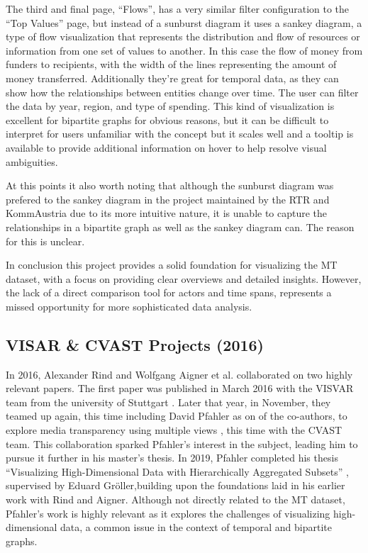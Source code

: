 \documentclass{vgtc}
\begin{document}
The third and final page, ``Flows'', has a very similar filter configuration to the ``Top Values'' page, but instead of a sunburst diagram it uses a sankey diagram, a type of flow visualization that represents the distribution and flow of resources or information from one set of values to another. In this case the flow of money from funders to recipients, with the width of the lines representing the amount of money transferred. Additionally they're great for temporal data, as they can show how the relationships between entities change over time. The user can filter the data by year, region, and type of spending. This kind of visualization is excellent for bipartite graphs for obvious reasons, but it can be difficult to interpret for users unfamiliar with the concept \textendash{} but it scales well and a tooltip is available to provide additional information on hover to help resolve visual ambiguities.

At this points it also worth noting that although the sunburst diagram was prefered to the sankey diagram in the project maintained by the RTR and KommAustria due to its more intuitive nature, it is unable to capture the relationships in a bipartite graph as well as the sankey diagram can. The reason for this is unclear.

In conclusion this project provides a solid foundation for visualizing the MT dataset, with a focus on providing clear overviews and detailed insights. However, the lack of a direct comparison tool for actors and time spans, represents a missed opportunity for more sophisticated data analysis.

\subsection{VISAR \& CVAST Projects (2016)}

In 2016, Alexander Rind and Wolfgang Aigner et al. collaborated on two highly relevant papers. The first paper was published in March 2016 with the VISVAR team from the university of Stuttgart \cite{aigner2016visual}. Later that year, in November, they teamed up again, this time including David Pfahler as on of the co-authors, to explore media transparency using multiple views \cite{rind2016exploring}, this time with the CVAST team. This collaboration sparked Pfahler's interest in the subject, leading him to pursue it further in his master's thesis. In 2019, Pfahler completed his thesis ``Visualizing High-Dimensional Data with Hierarchically Aggregated Subsets'' \cite{pfahlerflexible}, supervised by Eduard Gröller,building upon the foundations laid in his earlier work with Rind and Aigner. Although not directly related to the MT dataset, Pfahler's work is highly relevant as it explores the challenges of visualizing high-dimensional data, a common issue in the context of temporal and bipartite graphs.
\end{document}
